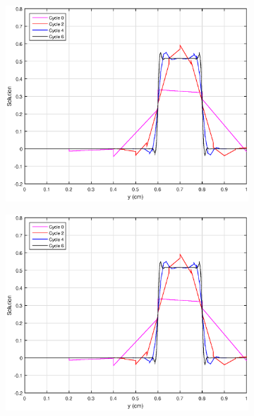 \begin{figure}
\centering
	\begin{subfigure}[b]{0.45\textwidth}
		\centering
		\label{subfig::SL_uniform_ef_wach}
		\includegraphics[width=\textwidth]{figures/sec_BF/SL_WACHSPRESS_uniform.eps}
		\caption{}
	\end{subfigure}
	\vfill
	\begin{subfigure}[b]{0.45\textwidth}
		\centering
		\label{subfig::SL_uniform_ef_pwld}
		\includegraphics[width=\textwidth]{figures/sec_BF/SL_PWLD_uniform.eps}
		\caption{}
	\end{subfigure}

\end{figure}
